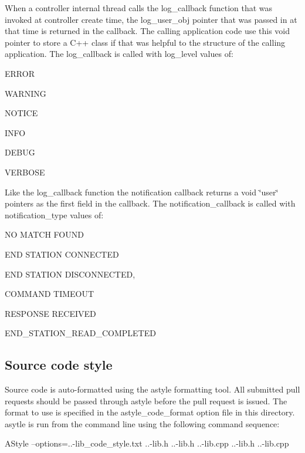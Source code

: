 When a controller internal thread calls the log\+\_\+callback function that was invoked at controller create time, the log\+\_\+user\+\_\+obj pointer that was passed in at that time is returned in the callback. The calling application code use this void pointer to store a C++ class if that was helpful to the structure of the calling application. The log\+\_\+callback is called with log\+\_\+level values of\+:
\begin{DoxyItemize}
\item E\+R\+R\+OR
\item W\+A\+R\+N\+I\+NG
\item N\+O\+T\+I\+CE
\item I\+N\+FO
\item D\+E\+B\+UG
\item V\+E\+R\+B\+O\+SE
\end{DoxyItemize}

Like the log\+\_\+callback function the notification callback returns a void \char`\"{}user\char`\"{} pointers as the first field in the callback. The notification\+\_\+callback is called with notification\+\_\+type values of\+:
\begin{DoxyItemize}
\item NO M\+A\+T\+CH F\+O\+U\+ND
\item E\+ND S\+T\+A\+T\+I\+ON C\+O\+N\+N\+E\+C\+T\+ED
\item E\+ND S\+T\+A\+T\+I\+ON D\+I\+S\+C\+O\+N\+N\+E\+C\+T\+ED,
\item C\+O\+M\+M\+A\+ND T\+I\+M\+E\+O\+UT
\item R\+E\+S\+P\+O\+N\+SE R\+E\+C\+E\+I\+V\+ED
\item E\+N\+D\+\_\+\+S\+T\+A\+T\+I\+O\+N\+\_\+\+R\+E\+A\+D\+\_\+\+C\+O\+M\+P\+L\+E\+T\+ED
\end{DoxyItemize}

\subsection*{Source code style }

Source code is auto-\/formatted using the astyle formatting tool. All submitted pull requests should be passed through astyle before the pull request is issued. The format to use is specified in the astyle\+\_\+code\+\_\+format option file in this directory. asytle is run from the command line using the following command sequence\+: \begin{DoxyVerb}AStyle --options=..\avdecc-lib\astyle_code_style.txt ..\avdecc-lib\controller\lib\*.h
         ..\avdecc-lib\controller\lib\src\*.h ..\avdecc-lib\controller\lib\src\*.cpp
         ..\avdecc-lib\controller\lib\src\msvc\*.h ..\avdecc-lib\controller\lib\src\msvc\*.cpp
\end{DoxyVerb}



